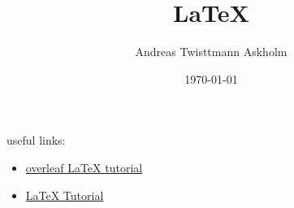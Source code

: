 \documentclass[a4paper,12pt]{article}
\title{\LaTeX{}}
\author{Andreas Twisttmann Askholm}
\date{\today}
\begin{document}
\maketitle
useful links:
\begin{itemize}
	\item \href{https://www.overleaf.com/learn/latex/Learn_LaTeX_in_30_minutes}{overleaf \LaTeX{} tutorial}
	\item \href{https://www.latex-tutorial.com/tutorials/hyperlinks/}{\LaTeX{} Tutorial}
\end{itemize}
\end{document}
